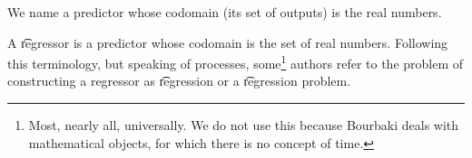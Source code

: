 

We name a predictor whose codomain (its set of outputs) is the real numbers.


A \t{regressor} is a predictor whose codomain is the set of real numbers.
Following this terminology, but speaking of processes, some\footnote{Most, nearly all, universally. We do not use this because Bourbaki deals with mathematical objects, for which there is no concept of time.} authors refer to the problem of constructing a regressor as \t{regression} or a \t{regression problem}.

\blankpage
